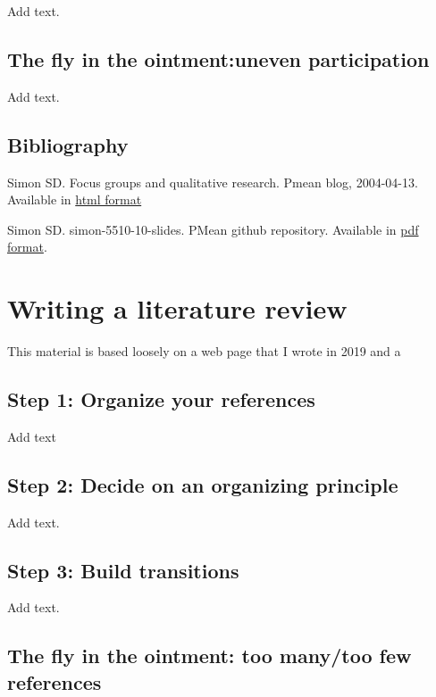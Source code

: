 \documentclass[
  letterpaper,
  DIV=11,
  numbers=noendperiod]{scrreprt}
\begin{document}
Add text.

\section{The fly in the ointment:uneven
participation}\label{the-fly-in-the-ointmentuneven-participation}

Add text.

\section{Bibliography}\label{bibliography-4}

Simon SD. Focus groups and qualitative research. Pmean blog, 2004-04-13.
Available in \href{http://pmean.com/posts/focus-groups-are-great/}{html
format}

Simon SD. simon-5510-10-slides. PMean github repository. Available in
\href{https://github.com/pmean/classes/blob/master/clinical-research-methodology/10/results/simon-5510-10-slides.pdf}{pdf
format}.


\chapter{Writing a literature review}\label{writing-a-literature-review}

This material is based loosely on a web page that I wrote in 2019 and a

\section{Step 1: Organize your
references}\label{step-1-organize-your-references}

Add text

\section{Step 2: Decide on an organizing
principle}\label{step-2-decide-on-an-organizing-principle}

Add text.

\section{Step 3: Build transitions}\label{step-3-build-transitions}

Add text.

\section{The fly in the ointment: too many/too few
references}\label{the-fly-in-the-ointment-too-manytoo-few-references}
\end{document}
